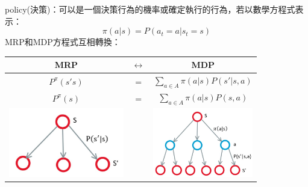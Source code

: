\documentclass[14pt,a4paper]{report}  %
\begin{document}
policy(決策)：可以是一個決策行為的機率或確定執行的行為，若以數學方程式表示：
$$\pi (a|s) = P(a_t=a|s_t=s)$$
MRP和MDP方程式互相轉換：\\
\begin{center}
\begin{tabular}[c]{ccc}    
 MRP & $\longleftrightarrow$ & MDP\\
\hline
$P^{\pi}(s's)$ & = & $\sum_{a\in A}\pi (a|s)P(s'|s, a)$\\
$P^{\pi}(s)$ & = & $\sum_{a\in A}\pi (a|s)P(s, a)$\\
\includegraphics[height=3cm]{MRP}&&\includegraphics[height=3cm]{MDP}\\
\hline
\end{tabular}
\end{center}
\end{document}
